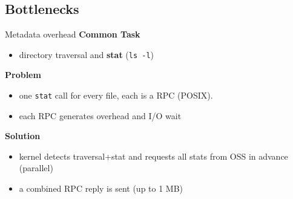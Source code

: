\subsection{Bottlenecks}
\begin{frame}{Metadata overhead}
    \textbf{Common Task}
    \begin{itemize}
        \item directory traversal and \textbf{stat} (\texttt{ls -l})
    \end{itemize}

    \textbf{Problem}
    \begin{itemize}
        \item one \texttt{stat} call for every file, each is a RPC (POSIX).
        \item each RPC generates overhead and I/O wait
    \end{itemize}

    \textbf{Solution}
    \begin{itemize}
        \item kernel detects traversal+stat and requests all stats from OSS in advance (parallel)
        \item a combined RPC reply is sent (up to 1 MB)
    \end{itemize}
\end{frame}

